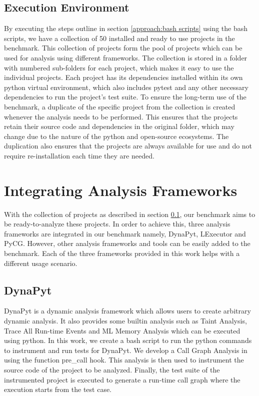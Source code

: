 \subsection{Execution Environment}
\label{approach:collection of projects}
By executing the steps outline in section \ref{approach:bash scripts} using the bash scripts, we have a collection of 50 installed and ready to use projects in the benchmark.
This collection of projects form the pool of projects which can be used for analysis using different frameworks.
The collection is stored in a folder with numbered sub-folders for each project, which makes it easy to use the individual projects.
Each project has its dependencies installed within its own python virtual environment, which also includes pytest and any other necessary dependencies to run the project's test suite.
To ensure the long-term use of the benchmark, a duplicate of the specific project from the collection is created whenever the analysis needs to be performed. 
This ensures that the projects retain their source code and dependencies in the original folder, which may change due to the nature of the python and open-source ecosystems.
The duplication also ensures that the projects are always available for use and do not require re-installation each time they are needed.   

\section{Integrating Analysis Frameworks}
\label{approach:analysis framework}
With the collection of projects as described in section \ref{approach:collection of projects}, our benchmark aims to be ready-to-analyze these projects.
In order to achieve this, three analysis frameworks are integrated in our benchmark namely, DynaPyt, LExecutor and PyCG. However, other analysis frameworks and tools can be easily added to the benchmark.
Each of the three frameworks provided in this work helps with a different usage scenario.
\subsection{DynaPyt}
DynaPyt is a dynamic analysis framework which allows users to create arbitrary dynamic analysis.
It also provides some builtin analysis such as Taint Analysis, Trace All Run-time Events and ML Memory Analysis which can be executed using python.\cite{DynaPyt2022}
In this work, we create a bash script to run the python commands to instrument and run tests for DynaPyt. 
We develop a Call Graph Analysis in using the function pre\_call hook.
This analysis is then used to instrument the source code of the project to be analyzed.
Finally, the test suite of the instrumented project is executed to generate a run-time call graph where the execution starts from the test case.
